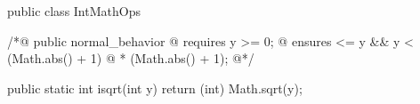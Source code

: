 public class IntMathOps { 

  /*@ public normal_behavior 
    @ requires y >= 0; 
    @ ensures \result * \result <= y && y < (Math.abs(\result) + 1)
    @ * (Math.abs(\result) + 1); 
    @*/ 

  public static int isqrt(int y) 
  { 
    return (int) Math.sqrt(y); 
  } 
} 
